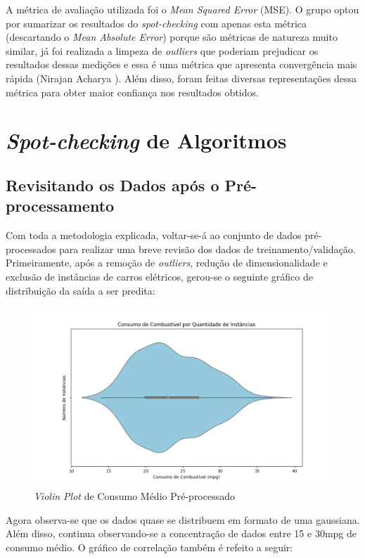 \documentclass{report}
\let\oldsection\section
\renewcommand\section{\clearpage\oldsection}
\begin{document}
A métrica de avaliação utilizada foi o \textit{Mean Squared Error} (MSE). O grupo optou por sumarizar os resultados do \textit{spot-checking} com apenas esta métrica (descartando o \textit{Mean Absolute Error}) porque são métricas
de natureza muito similar, já foi realizada a limpeza de \textit{outliers} que poderiam prejudicar os resultados dessas medições e essa é uma métrica que apresenta convergência mais rápida (Nirajan Acharya \cite{MSEAndMAE}). Além
disso, foram feitas diversas representações dessa métrica para obter maior confiança nos resultados obtidos.

\section{\textit{Spot-checking} de Algoritmos}

\subsection{Revisitando os Dados após o Pré-processamento}

Com toda a metodologia explicada, voltar-se-á ao conjunto de dados pré-processados para realizar uma breve revisão dos dados de treinamento/validação. Primeiramente, após a remoção de \textit{outliers}, redução de dimensionalidade
e exclusão de instâncias de carros elétricos, gerou-se o seguinte gráfico de distribuição da saída a ser predita:

\begin{figure}[h!]
  \centering
  \includegraphics[width=.85\linewidth]{images/plots/violin_plots/no_outliers_combination_mpg.png}
  \caption{\label{img:pre_combination_dist} \textit{Violin Plot} de Consumo Médio Pré-processado}
\end{figure}

Agora observa-se que os dados quase se distribuem em formato de uma gaussiana. Além disso, continua observando-se a concentração de dados entre 15 e 30mpg de consumo médio. O gráfico de correlação também é refeito a seguir:
\end{document}
